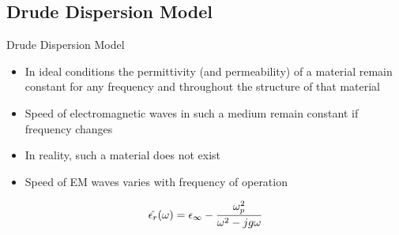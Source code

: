 \documentclass{beamer}
\begin{document}
\subsection{Drude Dispersion Model}
\begin{frame}{Drude Dispersion Model}
	\begin{itemize}
	\item In ideal conditions the permittivity (and permeability) of a material remain constant for any frequency and throughout the structure of that material
	\item Speed of electromagnetic waves in such a medium remain constant if frequency changes
	\item In reality, such a material does not exist
	\item Speed of EM waves varies with frequency of operation
	\end{itemize}
	\begin{equation*}
	\centering
	\hat{\epsilon_r}(\omega)=\epsilon_\infty-\dfrac{\omega^2_p}{\omega^2-jg\omega}
	\label{er-Drude}
	\end{equation*}
\end{frame}
\end{document}
